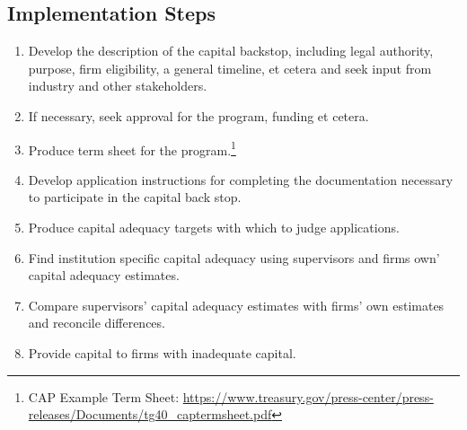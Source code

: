 \documentclass[12pt]{article}
\begin{document}
\subsection{Implementation Steps}

\begin{enumerate}

\item Develop the description of the capital backstop, including legal authority, purpose, firm eligibility, a general timeline, et cetera and seek input from industry and other stakeholders.
\item If necessary, seek approval for the program, funding et cetera.
\item Produce term sheet for the program.\footnote{CAP Example Term Sheet: \newline \url{https://www.treasury.gov/press-center/press-releases/Documents/tg40_captermsheet.pdf}}
\item Develop application instructions for completing the documentation necessary to participate in the capital back stop.
\item Produce capital adequacy targets with which to judge applications.
\item Find institution specific capital adequacy using supervisors and firms own' capital adequacy estimates.
\item Compare supervisors' capital adequacy estimates with firms' own estimates and reconcile differences.
\item Provide capital to firms with inadequate capital.

\end{enumerate}
\end{document}
